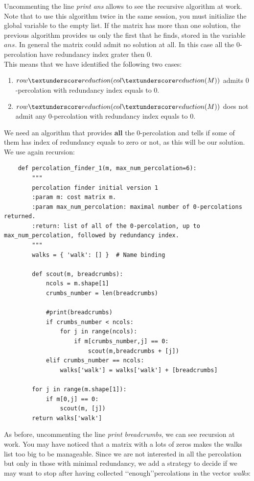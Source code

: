 \documentclass[12pt]{ClasseMatematicamente}
\begin{document}
\noindent
Uncommenting the line \emph{print ans} allows to see the recursive algorithm at work. Note that to use this algorithm twice in the same session, you must initialize the global variable to the empty list.
If the matrix has more than one solution, the previous algorithm provides us only the first that he finds, stored in the variable $ans$. In general the matrix could admit no solution at all. In this case all the $0$-percolation have redundancy index grater then $0$.\\ 
This means that we have identified the following two cases:
\begin{enumerate}
 \item $row\textunderscore reduction(col\textunderscore reduction(M))$ admits $0$-percolation with redundancy index equals to $0$.
 \item $row\textunderscore reduction(col\textunderscore reduction(M))$ does not admit any $0$-percolation with redundancy index equals to $0$.
\end{enumerate}
We need an algorithm that provides {\bf all} the $0$-percolation and tells if some of them has index of redundancy equals to zero or not, as this will be our solution. 
We use again recursion:


\begin{small}
\begin{lstlisting}
	def percolation_finder_1(m, max_num_percolation=6):
		"""
		percolation finder initial version 1
		:param m: cost matrix m.
		:param max_num_percolation: maximal number of 0-percolations returned.
		:return: list of all of the 0-percolation, up to max_num_percolation, followed by redundancy index.
		"""
		walks = { 'walk': [] }  # Name binding
		
		def scout(m, breadcrumbs):
			ncols = m.shape[1]
			crumbs_number = len(breadcrumbs)
			
			#print(breadcrumbs)
			if crumbs_number < ncols:
				for j in range(ncols):
					if m[crumbs_number,j] == 0:
						scout(m,breadcrumbs + [j])
			elif crumbs_number == ncols:
				walks['walk'] = walks['walk'] + [breadcrumbs]
		
		for j in range(m.shape[1]):
			if m[0,j] == 0:
				scout(m, [j])
		return walks['walk']
\end{lstlisting}
\end{small}


\noindent
As before, uncommenting the line \emph{print breadcrumbs}, we can see recursion at work. You may have noticed that a matrix with a lots of zeros makes the walks list too big to be manageable.
Since we are not interested in all the percolation but only in those with minimal redundancy, we add a strategy to decide if we may want to stop after having collected \lq\lq enough\rq\rq\phantom{z}percolations in the vector \emph{walks}:
\end{document}

